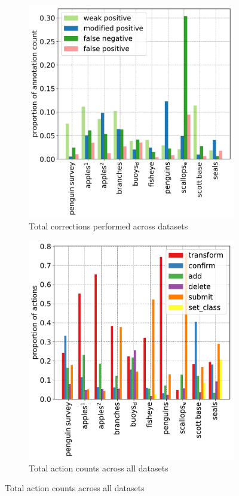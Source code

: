\begin{figure}[H] 
\centering
\begin{subfigure}{0.48\linewidth}
\includegraphics[width=1.0\linewidth]{charts/summaries/correction_counts.pdf}
\caption{Total corrections performed across datasets}
\end{subfigure}%
\begin{subfigure}{0.48\linewidth}
\includegraphics[width=1.0\linewidth]{charts/summaries/action_counts.pdf} 
\caption{Total action counts across all datasets}
\end{subfigure}

\label{fig:actions_dataset}
\end{figure}




